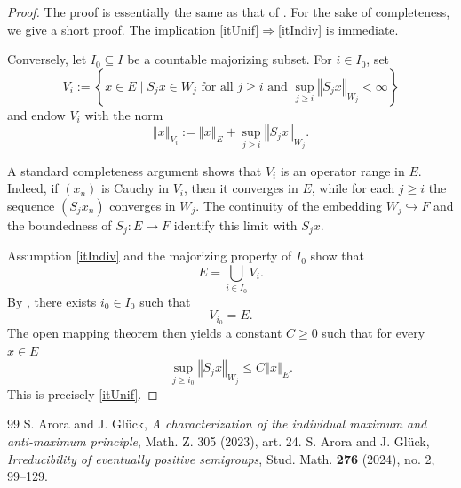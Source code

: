 \documentclass[10pt,a4paper]{amsart}
\newcommand{\norm}[1]{\left\Vert #1\right\Vert}
\begin{document}
	\begin{proof}
		The proof is essentially the same as that of \cite[Theorem 2.6]{AroraGlueck2024}. For the sake of completeness, we give a short proof. The implication \ref{itUnif}$\Rightarrow$\ref{itIndiv} is immediate.
		
		Conversely, let $I_0\subseteq I$ be a countable majorizing subset. For $i\in I_0$, set
		\[
		V_i := \left\{ x\in E \mid S_j x\in W_j \text{ for all } j\ge i \text{ and } \sup_{j\ge i}\norm{S_j x}_{W_j}<\infty \right\}
		\]
		and endow $V_i$ with the norm
		\[
		\norm{x}_{V_i} := \norm{x}_E + \sup_{j\ge i}\norm{S_j x}_{W_j}.
		\]
		
		A standard completeness argument shows that $V_i$ is an operator range in $E$. Indeed, if $(x_n)$ is Cauchy in $V_i$, then it converges in $E$, while for each $j\ge i$ the sequence $(S_j x_n)$ converges in $W_j$. The continuity of the embedding $W_j\hookrightarrow F$ and the boundedness of $S_j\colon E\to F$ identify this limit with $S_j x$.
		
		Assumption \ref{itIndiv} and the majorizing property of $I_0$ show that
		\[
		E = \bigcup_{i\in I_0} V_i.
		\]
		By \cite[Proposition 2.6]{AroraGlueck2023}, there exists $i_0\in I_0$ such that 
		\[
		V_{i_0} = E.
		\]
		The open mapping theorem then yields a constant $C\ge 0$ such that for every $x\in E$
		\[
		\sup_{j\ge i_0}\norm{S_j x}_{W_j} \le C\norm{x}_E.
		\]
		This is precisely \ref{itUnif}.
	\end{proof}
	

\begin{thebibliography}{99}
 S. Arora and J. Gl{\"u}ck, \emph{A characterization of the individual maximum and anti-maximum principle}, Math. Z. 305 (2023), art. 24.
 S. Arora and J. Gl\"uck, \emph{Irreducibility of eventually positive semigroups}, Stud. Math. \textbf{276} (2024), no. 2, 99--129.
\end{thebibliography}
\end{document}
